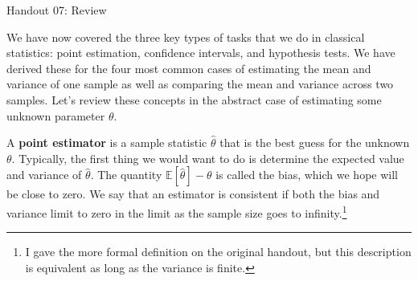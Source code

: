 \documentclass{tufte-handout}
\begin{document}
\justify

{\LARGE Handout 07: Review}

\vspace*{18pt}

\noindent
We have now covered the three key types of tasks that we do in
classical statistics: point estimation, confidence intervals, and
hypothesis tests. We have derived these for the four most common
cases of estimating the mean and variance of one sample as well as
comparing the mean and variance across two samples. Let's review
these concepts in the abstract case of estimating some unknown
parameter $\theta$.

A \textbf{point estimator} is a sample statistic $\hat{\theta}$ 
that is the best guess for the unknown $\theta$. Typically, the
first thing we would want to do is determine the expected value
and variance of $\hat{\theta}$. The quantity
$\mathbb{E}[\hat{\theta}] - \theta$ is called the bias, which
we hope will be close to zero. We say that an estimator is
consistent if both the bias and variance limit to zero in the
limit as the sample size goes to infinity.\footnote{
  I gave the more formal definition on the original handout,
  but this description is equivalent as long as the variance
  is finite.
}
\end{document}

